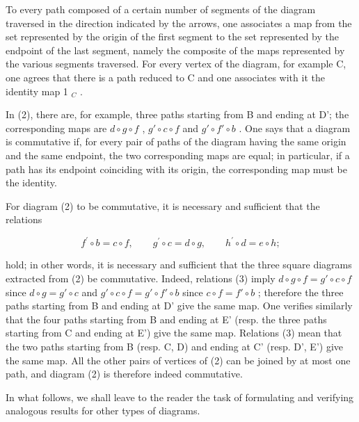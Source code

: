 To every path composed of a certain number of segments of the diagram traversed in the direction indicated by the arrows, one associates a map from the set represented by the origin of the first segment to the set represented by the endpoint of the last segment, namely the composite of the maps represented by the various segments traversed. For every vertex of the diagram, for example C, one agrees that there is a path reduced to C and one associates with it the identity map 1 \(_{C}\) .

In (2), there are, for example, three paths starting from B and ending at D'; the corresponding maps are \(d \circ g \circ f\) , \(g' \circ c \circ f\) and \(g' \circ f' \circ b\) . One says that a diagram is commutative if, for every pair of paths of the diagram having the same origin and the same endpoint, the two corresponding maps are equal; in particular, if a path has its endpoint coinciding with its origin, the corresponding map must be the identity.

For diagram (2) to be commutative, it is necessary and sufficient that the relations

\[
f ^ {\prime} \circ b = c \circ f, \qquad g ^ {\prime} \circ c = d \circ g, \qquad h ^ {\prime} \circ d = e \circ h;\tag{3}
\]

hold; in other words, it is necessary and sufficient that the three square diagrams extracted from (2) be commutative. Indeed, relations (3) imply \(d \circ g \circ f = g' \circ c \circ f\) since \(d \circ g = g' \circ c\) and \(g' \circ c \circ f = g' \circ f' \circ b\) since \(c \circ f = f' \circ b\) ; therefore the three paths starting from B and ending at D' give the same map. One verifies similarly that the four paths starting from B and ending at E' (resp. the three paths starting from C and ending at E') give the same map. Relations (3) mean that the two paths starting from B (resp. C, D) and ending at C' (resp. D', E') give the same map. All the other pairs of vertices of (2) can be joined by at most one path, and diagram (2) is therefore indeed commutative.

In what follows, we shall leave to the reader the task of formulating and verifying analogous results for other types of diagrams.


